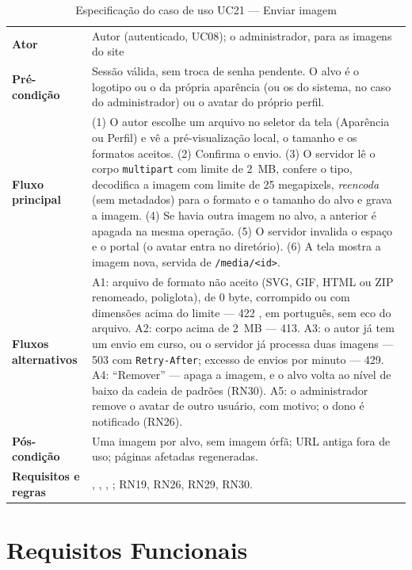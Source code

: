 \begin{table}[htb]
\caption{Especificação do caso de uso UC21 --- Enviar imagem}\label{tab:uc21}
\small
\begin{tabularx}{\linewidth}{@{}L{3.0cm}Y@{}}
\toprule
\textbf{Ator} & Autor (autenticado, UC08); o administrador, para as imagens do site\\
\textbf{Pré-condição} & Sessão válida, sem troca de senha pendente. O alvo é o logotipo ou o  da própria aparência (ou os do sistema, no caso do administrador) ou o avatar do próprio perfil.\\
\textbf{Fluxo principal} & (1) O autor escolhe um arquivo no seletor da tela (Aparência ou Perfil) e vê a pré-visualização local, o tamanho e os formatos aceitos. (2) Confirma o envio. (3) O servidor lê o corpo \texttt{multipart} com limite de 2~MB, confere o tipo, decodifica a imagem com limite de 25 megapixels, \emph{reencoda} (sem metadados) para o formato e o tamanho do alvo e grava a imagem. (4) Se havia outra imagem no alvo, a anterior é apagada na mesma operação. (5) O servidor invalida o espaço e o portal (o avatar entra no diretório). (6) A tela mostra a imagem nova, servida de \texttt{/media/<id>}.\\
\textbf{Fluxos alternativos} & A1: arquivo de formato não aceito (SVG, GIF, HTML ou ZIP renomeado, poliglota), de 0 byte, corrompido ou com dimensões acima do limite --- 422 , em português, sem eco do arquivo. A2: corpo acima de 2~MB --- 413. A3: o autor já tem um envio em curso, ou o servidor já processa duas imagens --- 503  com \texttt{Retry-After}; excesso de envios por minuto --- 429. A4: ``Remover'' --- apaga a imagem, e o alvo volta ao nível de baixo da cadeia de padrões (RN30). A5: o administrador remove o avatar de outro usuário, com motivo; o dono é notificado (RN26).\\
\textbf{Pós-condição} & Uma imagem por alvo, sem imagem órfã; URL antiga fora de uso; páginas afetadas regeneradas.\\
\textbf{Requisitos e regras} & , , , ; RN19, RN26, RN29, RN30.\\
\bottomrule
\end{tabularx}
\end{table}

\section{Requisitos Funcionais}\label{sec:rf}

